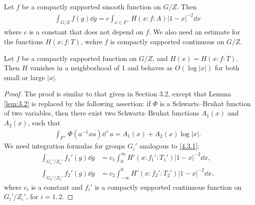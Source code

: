 \subsection{}
Let $f$ be a compactly supported smooth function on $G/Z$.
Then
\begin{align}
\label{4.3.1}
    \int_{G/Z} f(g)\dd g = c \int_{x \in F^\times} H(x:f:A)|1 - x|^{-2} \dd x
\end{align}
where $c$ is a constant that does not depend on $f$.
We also need an estimate for the functions $H(x:f:T)$, wehre $f$ is compactly supported continuous on $G/Z$.

\begin{lemma}
Let $f$ be a compactly supported function on $G/Z$, and $H(x) = H(x:f:T)$.
Then $H$ vanishes in a neighborhood of 1 and behaves as $O(\log |x|)$ for both small or large $|x|$.
\end{lemma}
\begin{proof}
The proof is similar to that given in Section 3.2, except that Lemma \ref{lem:3.2} is replaced by the following assertion: if $\Phi$ is a Schwarts--Bruhat function of two variables, then there exist two Schwartz--Bruhat functions $A_1(x)$ and $A_2(x)$, such that
\begin{align*}
    \int_{F^\times} \Phi(a^{-1}x a) \dd^\times a = A_1(x) + A_2(x) \log |x|.
\end{align*}
We need integration formulas for groups $G_i'$ analogous to \eqref{4.3.1}:
\begin{align}
    \int_{G_1' / Z_1'} f_1'(g) \dd g &= c_1 \int_{0}^{\infty} H'(x:f_1':T_1') |1 - x|^{-2} \dd x, \label{4.3.3} \\
    \int_{G_2' / Z_2'} f_2'(g) \dd g &= c_2 \int_{-\infty}^{0} H'(x:f_2':T_2') |1-x|^{-2} \dd x, \label{4.3.4}
\end{align}
where $c_i$ is a constant and $f_i'$ is a compactly supported continuous function on $G_i' / Z_i'$, for $i = 1, 2$.
\end{proof}

